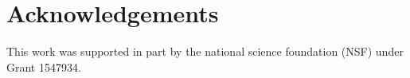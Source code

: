 \section{Acknowledgements}
This work was supported in part by the national science foundation (NSF) under Grant 1547934.